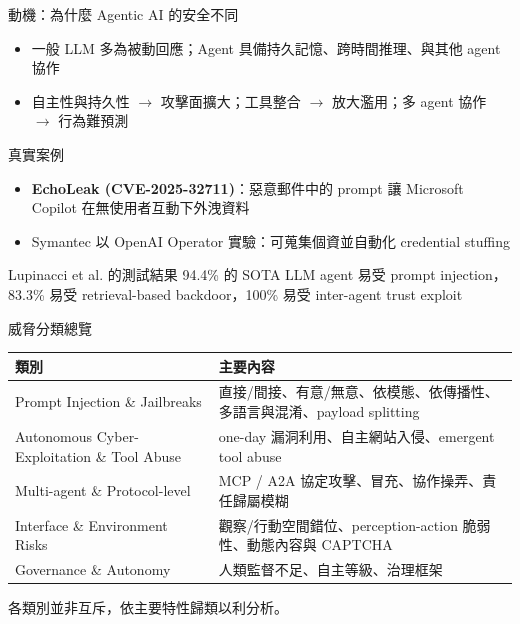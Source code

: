 \documentclass[aspectratio=169]{beamer}
\newcommand{\tabsetup}{\renewcommand{\arraystretch}{1.18}}
\begin{document}
\begin{frame}{動機：為什麼 Agentic AI 的安全不同}
    \small
    \begin{itemize}
        \item 一般 LLM 多為被動回應；Agent 具備持久記憶、跨時間推理、與其他 agent 協作
        \item 自主性與持久性 $\rightarrow$ 攻擊面擴大；工具整合 $\rightarrow$ 放大濫用；多 agent 協作 $\rightarrow$ 行為難預測
    \end{itemize}

    \begin{block}{真實案例}
        \begin{itemize}
            \item \textbf{EchoLeak (CVE-2025-32711)}：惡意郵件中的 prompt 讓 Microsoft Copilot 在無使用者互動下外洩資料
            \item Symantec 以 OpenAI Operator 實驗：可蒐集個資並自動化 credential stuffing
        \end{itemize}
    \end{block}

    \begin{alertblock}{Lupinacci et al. 的測試結果}
        94.4\% 的 SOTA LLM agent 易受 prompt injection，83.3\% 易受 retrieval-based backdoor，100\% 易受 inter-agent trust exploit
    \end{alertblock}
\end{frame}


\begin{frame}{威脅分類總覽}
    \tabsetup
    \footnotesize
    \begin{table}
        \centering
        \begin{tabular}{@{}l p{8.2cm}@{}}
            \toprule
            類別 & 主要內容 \\
            \midrule
            Prompt Injection \& Jailbreaks & 直接/間接、有意/無意、依模態、依傳播性、多語言與混淆、payload splitting \\
            Autonomous Cyber-Exploitation \& Tool Abuse & one-day 漏洞利用、自主網站入侵、emergent tool abuse \\
            Multi-agent \& Protocol-level & MCP / A2A 協定攻擊、冒充、協作操弄、責任歸屬模糊 \\
            Interface \& Environment Risks & 觀察/行動空間錯位、perception-action 脆弱性、動態內容與 CAPTCHA \\
            Governance \& Autonomy & 人類監督不足、自主等級、治理框架 \\
            \bottomrule
        \end{tabular}
    \end{table}
    \small 各類別並非互斥，依主要特性歸類以利分析。
\end{frame}
\end{document}
